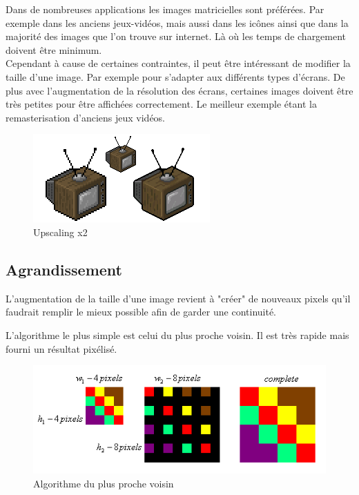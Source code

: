 \documentclass[12pt, a4paper]{article}
\begin{document}
Dans de nombreuses applications les images matricielles sont préférées. Par exemple dans les anciens jeux-vidéos, mais aussi dans les icônes ainsi que dans la majorité des images que l'on trouve sur internet. Là où les temps de chargement doivent être minimum.
\\

Cependant à cause de certaines contraintes, il peut être intéressant de modifier la taille d'une image. Par exemple pour s'adapter aux différents types d'écrans. De plus avec l'augmentation de la résolution des écrans, certaines images doivent être très petites pour être affichées correctement. Le meilleur exemple étant la remasterisation d'anciens jeux vidéos.

\begin{figure}[h!]
  \centering
  \includegraphics[scale=0.7]{Images/tele.png}
  \caption{Upscaling x2}
\end{figure}

\subsection{Agrandissement}
 
L'augmentation de la taille d'une image revient à "créer" de nouveaux pixels qu'il faudrait remplir le mieux possible afin de garder une continuité.

L'algorithme le plus simple est celui du plus proche voisin. Il est très rapide mais fourni un résultat pixélisé. 

\begin{figure}[h!]
  \centering
  \includegraphics[scale=0.6]{Images/plus_proche_voisin.png}
  \caption{Algorithme du plus proche voisin}
\end{figure}
\end{document}
